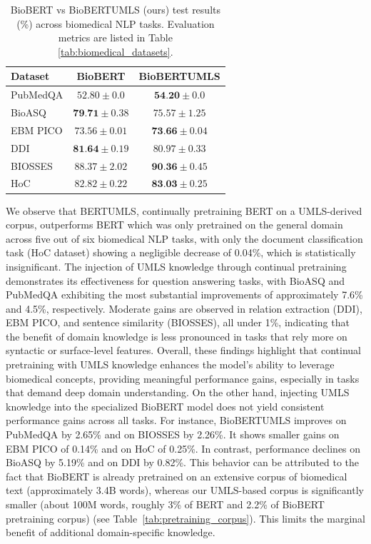 \documentclass[10pt, a4paper]{article}
\begin{document}
\begin{table}[h]
\centering
\begin{tabular}{|l|c|c|}
\hline
Dataset & BioBERT & BioBERTUMLS \\
\hline
PubMedQA & $52.80 \pm 0.0$ & $\textbf{54.20} \pm 0.0$ \\
\hline
BioASQ & $\textbf{79.71} \pm 0.38$ & $75.57 \pm 1.25$ \\
\hline
EBM PICO & $73.56 \pm 0.01$ & $\textbf{73.66} \pm 0.04$ \\
\hline
DDI & $\textbf{81.64} \pm 0.19$ & $80.97 \pm 0.33$ \\
\hline
BIOSSES & $88.37 \pm 2.02$ & $\textbf{90.36} \pm 0.45$ \\
\hline
HoC & $82.82 \pm 0.22$ & $\textbf{83.03} \pm 0.25$ \\
\hline
\end{tabular}
\caption{BioBERT vs BioBERTUMLS (ours) test results (\%) across biomedical NLP tasks. Evaluation metrics are listed in Table \ref{tab:biomedical_datasets}.}
\label{tab:biobert_results}
\end{table}
We observe that BERTUMLS, continually pretraining BERT on a UMLS-derived corpus, outperforms BERT which was only pretrained on the general domain across five out of six biomedical NLP tasks, with only the document classification task (HoC dataset) showing a negligible decrease of 0.04\%, which is statistically insignificant. The injection of UMLS knowledge through continual pretraining  demonstrates its effectiveness for question answering tasks, with BioASQ and PubMedQA exhibiting the most substantial improvements of approximately 7.6\% and 4.5\%, respectively. Moderate gains are observed in relation extraction (DDI), EBM PICO, and sentence similarity (BIOSSES), all under 1\%, indicating that the benefit of domain knowledge is less pronounced in tasks that rely more on syntactic or surface-level features. Overall, these findings highlight that continual pretraining with UMLS knowledge enhances the model’s ability to leverage biomedical concepts, providing meaningful performance gains, especially in tasks that demand deep domain understanding.
On the other hand, injecting UMLS knowledge into the specialized BioBERT model does not yield consistent performance gains across all tasks. For instance, BioBERTUMLS improves on PubMedQA by 2.65\% and on BIOSSES by 2.26\%. It shows smaller gains on EBM PICO of 0.14\% and on HoC of 0.25\%. In contrast, performance declines on BioASQ by 5.19\% and on DDI by 0.82\%. This behavior can be attributed to the fact that BioBERT is already pretrained on an extensive corpus of biomedical text (approximately 3.4B words), whereas our UMLS-based corpus is significantly smaller (about 100M words, roughly 3\% of BERT and 2.2\% of BioBERT pretraining corpus) (see Table~\ref{tab:pretraining_corpus}). This limits the marginal benefit of additional domain-specific knowledge.  
\end{document}
